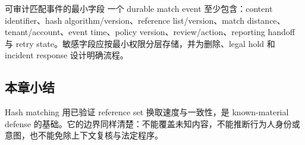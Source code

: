 \begin{importantbox}{可审计匹配事件的最小字段}
一个 durable match event 至少包含：content identifier、hash algorithm/version、reference list/version、match distance、tenant/account、event time、policy version、review/action、reporting handoff 与 retry state。敏感字段应按最小权限分层存储，并为删除、legal hold 和 incident response 设计明确流程。
\end{importantbox}

\subsection{本章小结}

Hash matching 用已验证 reference set 换取速度与一致性，是 known-material defense 的基础。它的边界同样清楚：不能覆盖未知内容，不能推断行为人身份或意图，也不能免除上下文复核与法定程序。

